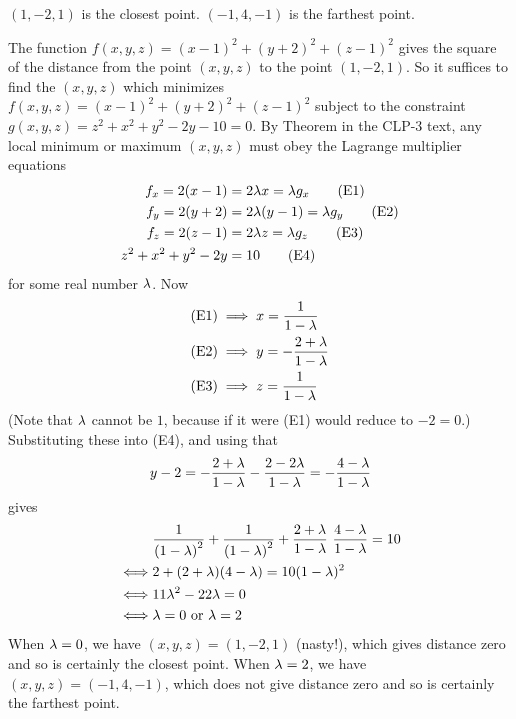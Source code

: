 %

\begin{answer}
$(1,-2,1)$  is the closest point. 
$(-1,4,-1)$ is the farthest point.
\end{answer}

\begin{solution}
The function $f(x,y,z)=(x-1)^2+(y+2)^2+(z-1)^2$ gives the square of 
the distance from  the point $(x,y,z)$ to the point $(1,-2,1)$. 
So it suffices to find the $(x,y,z)$ which minimizes $
f(x,y,z)=(x-1)^2+(y+2)^2+(z-1)^2$ subject 
to the constraint $g(x,y,z) = z^2 + x^2 + y^2 - 2y - 10=0$.
By Theorem  in the CLP-3 text, any local minimum
or maximum $(x,y,z)$ must obey the  Lagrange multiplier equations
\begin{align*}
f_x = 2(x-1) &= 2 \lambda x = \lambda g_x \tag{E1} \\ 
f_y = 2(y+2) &=2 \lambda (y-1)  = \lambda g_y \tag{E2} \\ 
f_z = 2(z-1) &= 2\lambda z = \lambda g_z \tag{E3} \\ 
z^2 + x^2 + y^2 - 2y &= 10 \tag{E4}
\end{align*}
for some real number $\lambda$. Now
\begin{align*}
\text{(E1)} &\implies x=\frac{1}{1-\lambda} \\
\text{(E2)} &\implies y=-\frac{2+\lambda}{1-\lambda} \\
\text{(E3)} &\implies z=\frac{1}{1-\lambda} 
\end{align*}
(Note that $\lambda$ cannot be $1$, because if it were (E1) would reduce to $-2=0$.)
Substituting these into (E4), and using that 
\begin{equation*}
y-2=-\frac{2+\lambda}{1-\lambda} -\frac{2-2\lambda}{1-\lambda}=-\frac{4-\lambda}{1-\lambda}
\end{equation*}
gives
\begin{align*}
&\frac{1}{{(1-\lambda)}^2}+\frac{1}{{(1-\lambda)}^2} 
   +\frac{2+\lambda}{1-\lambda}\ \frac{4-\lambda}{1-\lambda} = 10 \\
\iff & 2+(2+\lambda)(4-\lambda) = 10 (1-\lambda)^2 \\
\iff & 11\lambda^2 -22\lambda =0 \\
\iff & \lambda=0\text{ or }\lambda=2
\end{align*}
When $\lambda=0$, we have $(x,y,z) = (1,-2,1)$ (nasty!), which gives 
distance zero and so is certainly the closest point. 
When $\lambda=2$, we have $(x,y,z) = (-1,4,-1)$, which does not give 
distance zero and so is certainly the farthest point.

\end{solution}

